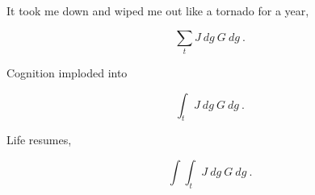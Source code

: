 

It took me down and wiped me out like a tornado for a year,

  $$\sum_t J\ dg\ G\ dg\ .$$

Cognition imploded into 

  $$\int_t J\ dg\ G\ dg\ .$$

Life resumes,

  $$\int\int_t J\ dg\ G\ dg\ .$$

\bye
